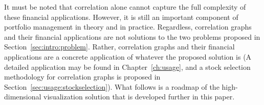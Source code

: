 It must be noted that correlation alone cannot capture the full complexity of 
these financial applications. However, it is still an important component of 
portfolio management in theory and in practice. Regardless, correlation graphs 
and their financial applications are not solutions to the two problems proposed 
in Section~\ref{sec:intro:problem}. Rather, correlation graphs and their 
financial applications are a concrete application of whatever the proposed 
solution is (A detailed application may be found in Chapter~\ref{ch:usage}, and 
a stock selection methodology for correlation graphs is proposed in 
Section~\ref{sec:usage:stockselection}). What follows is a roadmap of the 
high-dimensional visualization solution that is developed further in this 
paper. 